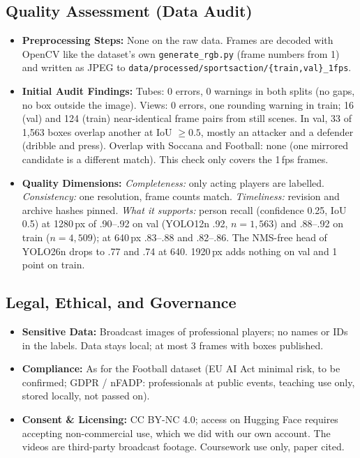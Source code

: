 \documentclass[11pt, a4paper]{article}
\begin{document}
\subsection{Quality Assessment (Data Audit)}
\begin{itemize}
    \item \textbf{Preprocessing Steps:} None on the raw data. Frames are decoded with OpenCV like the dataset's own \texttt{generate\_rgb.py} (frame numbers from 1) and written as JPEG to \texttt{data/processed/}\allowbreak\texttt{sportsaction/}\allowbreak\texttt{\{train,val\}\_1fps}.
    \item \textbf{Initial Audit Findings:} Tubes: 0 errors, 0 warnings in both splits (no gaps, no box outside the image). Views: 0 errors, one rounding warning in train; 16 (val) and 124 (train) near-identical frame pairs from still scenes. In val, 33 of 1,563 boxes overlap another at IoU $\ge 0.5$, mostly an attacker and a defender (dribble and press). Overlap with Soccana and Football: none (one mirrored candidate is a different match). This check only covers the 1\,fps frames.
    \item \textbf{Quality Dimensions:} \emph{Completeness:} only acting players are labelled. \emph{Consistency:} one resolution, frame counts match. \emph{Timeliness:} revision and archive hashes pinned. \emph{What it supports:} person recall (confidence 0.25, IoU 0.5) at 1280\,px of .90--.92 on val (YOLO12n .92, $n=1{,}563$) and .88--.92 on train ($n=4{,}509$); at 640\,px .83--.88 and .82--.86. The NMS-free head of YOLO26n drops to .77 and .74 at 640. 1920\,px adds nothing on val and 1 point on train.
\end{itemize}

\subsection{Legal, Ethical, and Governance}
\begin{itemize}
    \item \textbf{Sensitive Data:} Broadcast images of professional players; no names or IDs in the labels. Data stays local; at most 3 frames with boxes published.
    \item \textbf{Compliance:} As for the Football dataset (EU AI Act minimal risk, to be confirmed; GDPR / nFADP: professionals at public events, teaching use only, stored locally, not passed on).
    \item \textbf{Consent \& Licensing:} CC BY-NC 4.0; access on Hugging Face requires accepting non-commercial use, which we did with our own account. The videos are third-party broadcast footage. Coursework use only, paper cited.
\end{itemize}
\end{document}
